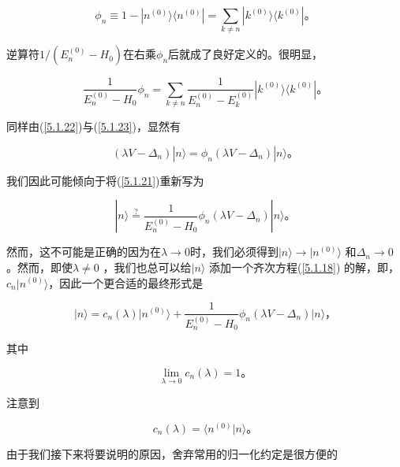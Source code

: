 ﻿\documentclass[UTF8,twoside]{ctexart}
\begin{document}
\begin{equation} \label{5.1.23}
\phi_n\equiv 1-|n^{(0)}\rangle\langle n^{(0)}| =\displaystyle\sum_{k\neq n} |k^{(0)}\rangle\langle k^{(0)}|\text{。}
\end{equation}

\noindent 逆算符$1/(E_n^{(0)} - H_0)$在右乘$\phi_n$后就成了良好定义的。很明显，

\begin{equation} \label{5.1.24}
\dfrac{1}{E_n^{(0)}-H_0}\phi_n = \displaystyle\sum_{k\neq n}\dfrac{1}{E_n^{(0)}-E_k^{(0)}}|k^{(0)}\rangle\langle k^{(0)}|\text{。}
\end{equation}

\noindent 同样由(\ref{5.1.22})与(\ref{5.1.23})，显然有

\begin{equation} \label{5.1.25}
(\lambda V - \Delta_n)|n\rangle = \phi_n(\lambda V - \Delta_n)|n\rangle\text{。}
\end{equation}

\noindent 我们因此可能倾向于将(\ref{5.1.21})重新写为

\begin{equation} \label{5.1.26}
|n\rangle \overset{?}{=} \dfrac{1}{E_n^{(0)}-H_0}\phi_n(\lambda V-\Delta_n)|n\rangle\text{。}
\end{equation}

\noindent 然而，这不可能是正确的因为在$\lambda \rightarrow 0$时，我们必须得到$|n\rangle \rightarrow |n^{(0)}\rangle$ 和$\Delta_n \rightarrow 0$。然而，即使$\lambda \neq 0$ ，我们也总可以给$|n\rangle$ 添加一个齐次方程(\ref{5.1.18}) 的解，即，$c_n|n^{(0)}\rangle$，因此一个更合适的最终形式是

\begin{equation} \label{5.1.27}
|n\rangle = c_n(\lambda)|n^{(0)}\rangle + \dfrac{1}{E_n^{(0)}-H_0}\phi_n(\lambda V - \Delta_n)|n\rangle\text{，}
\end{equation}

\noindent 其中

\begin{equation} \label{5.1.28}
\lim\limits_{\lambda \to 0}c_n(\lambda) = 1\text{。}
\end{equation}

\noindent 注意到

\begin{equation} \label{5.1.29}
c_n(\lambda) = \langle n^{(0)}|n\rangle\text{。}
\end{equation}

\noindent 由于我们接下来将要说明的原因，舍弃常用的归一化约定是很方便的
\end{document}
